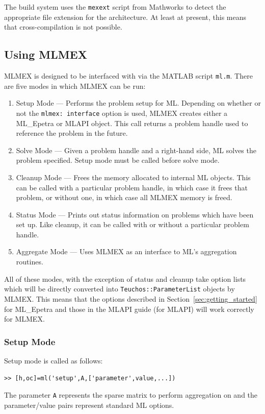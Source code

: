 \documentclass{article}[11pt]
\begin{document}
The build system uses the \texttt{mexext} script from Mathworks to
detect the appropriate file extension for the architecture.  At least
at present, this means that cross-compilation is not possible.  

\subsection{Using MLMEX}\label{sec:mlmex:usage}
MLMEX is designed to be interfaced with via the MATLAB script
\texttt{ml.m}.  There are five modes in which MLMEX can be run:
\begin{enumerate}
\item Setup Mode --- Performs the problem setup for ML.
  Depending on whether or not the \texttt{mlmex: interface} option is
  used, MLMEX creates either a ML\_Epetra or MLAPI object.  This call
  returns a problem handle used to reference the problem in the future.
\item Solve Mode --- Given a problem handle and a right-hand side, ML
  solves the problem specified.  Setup mode must be called before
  solve mode.
\item Cleanup Mode --- Frees the memory allocated to internal ML
  objects.  This can be called with a particular problem handle, in
  which case it frees that problem, or without one, in which case all
  MLMEX memory is freed.
\item Status Mode --- Prints out status information on problems which
  have been set up.  Like cleanup, it can be called with or without a
  particular problem handle.
\item Aggregate Mode --- Uses MLMEX as an interface to ML's
  aggregation routines. 
\end{enumerate}
All of these modes, with the exception of status and cleanup take
option lists which will be directly converted into
\texttt{Teuchos::ParameterList} objects by MLMEX.  This means that 
the options described in Section~\ref{sec:getting_started} for
ML\_Epetra and those in the MLAPI guide (for MLAPI) will work
correctly for MLMEX. 

\subsubsection{Setup Mode}
Setup mode is called as follows:
\begin{verbatim}
>> [h,oc]=ml('setup',A,['parameter',value,...]) 
\end{verbatim}
The parameter \texttt{A} represents the sparse matrix to perform aggregation on
and the parameter/value pairs represent standard ML options.
\end{document}
